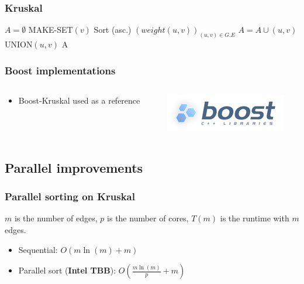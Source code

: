 \documentclass{beamer}
\begin{document}
\begin{frame}[fragile]
\frametitle{Kruskal}
\small
\begin{algorithm}[H]
\begin{algorithmic}[1]
\STATE $A = \emptyset$
\STATE MAKE-SET$(v)$
\ENDFOR
\STATE Sort (asc.) $\left(weight(u, v)\right)_{(u, v) \in G.E}$
\STATE $A = A \cup {(u, v)}$
\STATE UNION$(u, v)$
\ENDIF
\ENDFOR
\RETURN A
\end{algorithmic}
\end{algorithm}


\end{frame}

\begin{frame}
\frametitle{Boost implementations}

\begin{columns}
\begin{column}{.7\linewidth}
\begin{itemize}
\item Boost-Kruskal used as a reference
\end{itemize}
\end{column}

\begin{column}{.3\linewidth}
\includegraphics[width=\linewidth]{boost.png}
\end{column}
\end{columns}

\end{frame}


\subsection{Parallel improvements}

\begin{frame}

    \frametitle{Parallel sorting on Kruskal}

    $m$ is the number of edges, $p$ is the number of cores, $T(m)$ is the runtime with $m$ edges.

    \begin{itemize}
        \item Sequential: $ O \left( m \ln(m) + m \right) $
        \item Parallel sort (\textbf{Intel TBB}): $ O \left( \frac{m \ln(m)}{p} + m \right) $
    \end{itemize}

\end{frame}
\end{document}
